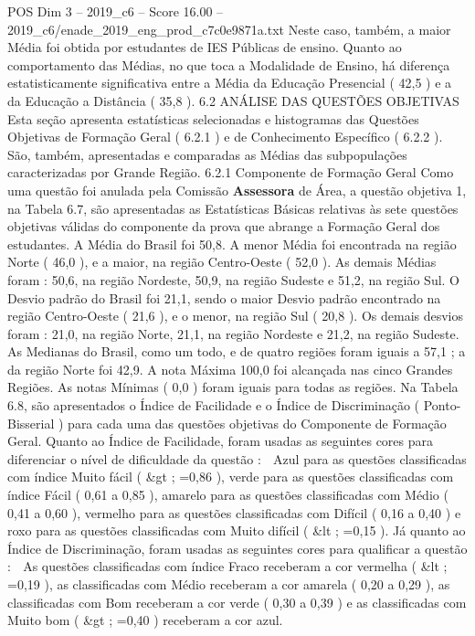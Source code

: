\begin{textsample}{POS Dim 3 – 2019\_c6 – Score 16.00 – 2019\_c6/enade\_2019\_eng\_prod\_c7c0e9871a.txt}
Neste caso, também, a maior Média foi obtida por estudantes de IES Públicas de ensino.
Quanto ao comportamento das Médias, no que toca a Modalidade de Ensino, há diferença estatisticamente significativa entre a Média da Educação Presencial ( 42,5 ) e a da Educação a Distância ( 35,8 ). 6.2 ANÁLISE DAS QUESTÕES OBJETIVAS Esta seção apresenta estatísticas selecionadas e histogramas das Questões Objetivas de Formação Geral ( 6.2.1 ) e de Conhecimento Específico ( 6.2.2 ).
São, também, apresentadas e comparadas as Médias das subpopulações caracterizadas por Grande Região. 6.2.1 Componente de Formação Geral Como uma questão foi anulada pela Comissão \textbf{Assessora} de Área, a questão objetiva 1, na Tabela 6.7, são apresentadas as Estatísticas Básicas relativas às sete questões objetivas válidas do componente da prova que abrange a Formação Geral dos estudantes.
A Média do Brasil foi 50,8.
A menor Média foi encontrada na região Norte ( 46,0 ), e a maior, na região Centro-Oeste ( 52,0 ).
As demais Médias foram : 50,6, na região Nordeste, 50,9, na região Sudeste e 51,2, na região Sul.
O Desvio padrão do Brasil foi 21,1, sendo o maior Desvio padrão encontrado na região Centro-Oeste ( 21,6 ), e o menor, na região Sul ( 20,8 ).
Os demais desvios foram : 21,0, na região Norte, 21,1, na região Nordeste e 21,2, na região Sudeste.
As Medianas do Brasil, como um todo, e de quatro regiões foram iguais a 57,1 ; a da região Norte foi 42,9.
A nota Máxima 100,0 foi alcançada nas cinco Grandes Regiões.
As notas Mínimas ( 0,0 ) foram iguais para todas as regiões.
Na Tabela 6.8, são apresentados o Índice de Facilidade e o Índice de Discriminação ( Ponto-Bisserial ) para cada uma das questões objetivas do Componente de Formação Geral.
Quanto ao Índice de Facilidade, foram usadas as seguintes cores para diferenciar o nível de dificuldade da questão :  Azul para as questões classificadas com índice Muito fácil ( \&gt ; =0,86 ), verde para as questões classificadas com índice Fácil ( 0,61 a 0,85 ), amarelo para as questões classificadas com Médio ( 0,41 a 0,60 ), vermelho para as questões classificadas com Difícil ( 0,16 a 0,40 ) e roxo para as questões classificadas com Muito difícil ( \&lt ; =0,15 ).
Já quanto ao Índice de Discriminação, foram usadas as seguintes cores para qualificar a questão :  As questões classificadas com índice Fraco receberam a cor vermelha ( \&lt ; =0,19 ), as classificadas com Médio receberam a cor amarela ( 0,20 a 0,29 ), as classificadas com Bom receberam a cor verde ( 0,30 a 0,39 ) e as classificadas com Muito bom ( \&gt ; =0,40 ) receberam a cor azul.

\end{textsample}
